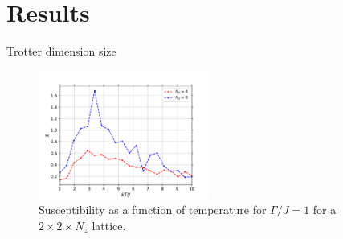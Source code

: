 \documentclass[aspectratio=169, xcolor=dvipsnames]{beamer}
\begin{document}
\section{Results}

\begin{frame}{Trotter dimension size}
	
	\begin{figure}
		\centering
		\includegraphics[width=0.5\textwidth]{Plots/T_transition_chi_nz.pdf}
		\caption{Susceptibility as a function of temperature for $\Gamma/J=1$ for a $2\times2\times N_z$ lattice.}
		\label{fig:transition_chi_nz}
	\end{figure}
	
\end{frame}
\end{document}
